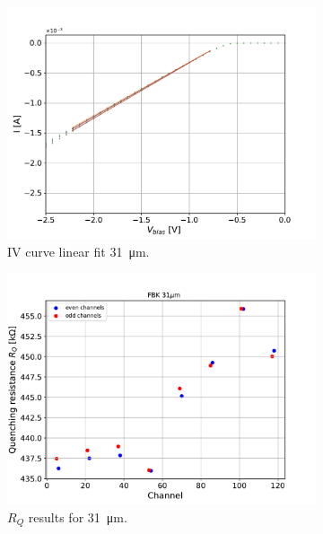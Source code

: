 \begin{figure}[htbp]
\begin{subfigure}{0.48\textwidth}
    \includegraphics[width=\textwidth]{gfx/plots/Rq/31/FBK_31um_IV.pdf}
    \caption{IV curve linear fit \SI{31}{\micro m}.}
    \label{fig:}
  \end{subfigure}
  \hfill
  \begin{subfigure}{0.48\textwidth}
    \includegraphics[width=\textwidth]{gfx/plots/Rq/31/FBK_31um_RQs.pdf}
    \caption{$R_Q$ results for \SI{31}{\micro m}.}
    \label{fig:}
  \end{subfigure}
  \begin{subfigure}{0.48\textwidth}

\end{subfigure}
\end{figure}
